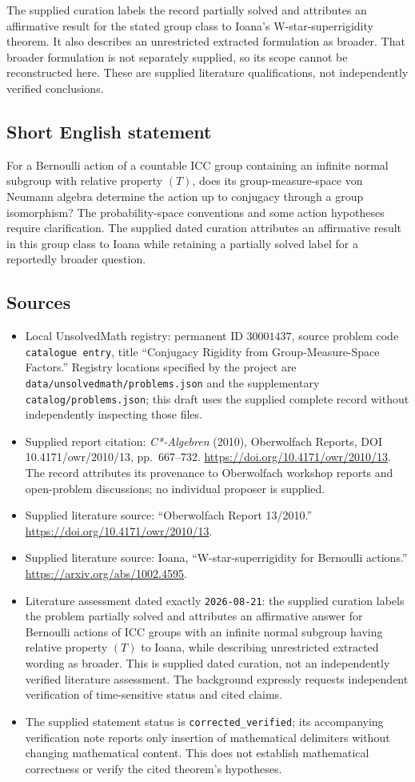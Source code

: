 \documentclass[11pt]{article}
\begin{document}
The supplied curation labels the record partially solved and attributes an affirmative result for the stated group class to Ioana's W-star-superrigidity theorem. It also describes an unrestricted extracted formulation as broader. That broader formulation is not separately supplied, so its scope cannot be reconstructed here. These are supplied literature qualifications, not independently verified conclusions.
\subsection{Short English statement}
For a Bernoulli action of a countable ICC group containing an infinite normal subgroup with relative property \((T)\), does its group-measure-space von Neumann algebra determine the action up to conjugacy through a group isomorphism? The probability-space conventions and some action hypotheses require clarification. The supplied dated curation attributes an affirmative result in this group class to Ioana while retaining a partially solved label for a reportedly broader question.
\subsection{Sources}
\begin{itemize}
\item Local UnsolvedMath registry: permanent ID \(30001437\), source problem code \texttt{catalogue entry}, title ``Conjugacy Rigidity from Group-Measure-Space Factors.'' Registry locations specified by the project are \texttt{data/unsolvedmath/problems.json} and the supplementary \texttt{catalog/problems.json}; this draft uses the supplied complete record without independently inspecting those files.
\item Supplied report citation: \emph{C*-Algebren} (2010), Oberwolfach Reports, DOI 10.4171/owr/2010/13, pp.\ 667--732. \url{https://doi.org/10.4171/owr/2010/13}. The record attributes its provenance to Oberwolfach workshop reports and open-problem discussions; no individual proposer is supplied.
\item Supplied literature source: ``Oberwolfach Report 13/2010.'' \url{https://doi.org/10.4171/owr/2010/13}.
\item Supplied literature source: Ioana, ``W-star-superrigidity for Bernoulli actions.'' \url{https://arxiv.org/abs/1002.4595}.
\item Literature assessment dated exactly \texttt{2026-08-21}: the supplied curation labels the problem partially solved and attributes an affirmative answer for Bernoulli actions of ICC groups with an infinite normal subgroup having relative property \((T)\) to Ioana, while describing unrestricted extracted wording as broader. This is supplied dated curation, not an independently verified literature assessment. The background expressly requests independent verification of time-sensitive status and cited claims.
\item The supplied statement status is \texttt{corrected\_verified}; its accompanying verification note reports only insertion of mathematical delimiters without changing mathematical content. This does not establish mathematical correctness or verify the cited theorem's hypotheses.
\end{itemize}
\end{document}
